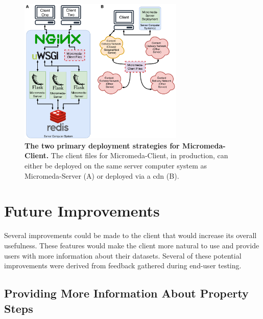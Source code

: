 \begin{figure}[!ht]
  \centering
	\includegraphics[width=0.7\textwidth]{media/micromeda-client-deployment.pdf}
	 \caption[The two primary deployment strategies for 
Micromeda-Client.]{\textbf{The two primary deployment strategies for 
Micromeda-Client.} The client files for Micromeda-Client, in production, can 
either be deployed on the same server computer system as Micromeda-Server (A) or 
deployed via a \gls{cdn} (B).}
	 \label{fig:client-deployment}
\end{figure}

\section{Future Improvements} \label{client-improvements}

Several improvements could be made to the client that would increase its overall 
usefulness. These features would make the client more natural to use and provide 
users with more information about their datasets. Several of these potential 
improvements were derived from feedback gathered during end-user testing.

\subsection{Providing More Information About Property Steps}

